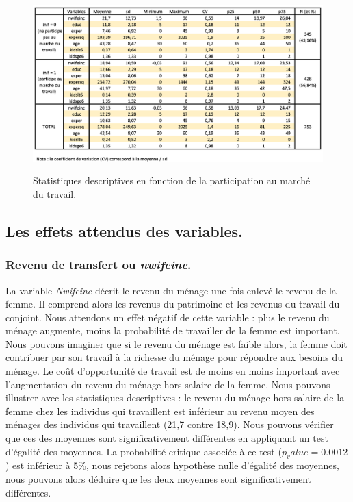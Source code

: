 \begin{figure}[h]
    \caption{Statistiques descriptives en fonction de la participation au marché du travail.}
    \includegraphics[scale = 0.65]{101_graphics/11_Stats_desc.png}
    \centering
    \label{fig:StatsDesc}
\end{figure}





\subsection{Les effets attendus des variables.}

\subsubsection*{Revenu de transfert ou \emph{nwifeinc}.}

La variable \emph{Nwifeinc} décrit le revenu du ménage une fois enlevé le revenu de la femme. Il comprend alors les revenus du patrimoine et les revenus du travail du conjoint. Nous attendons un effet négatif de cette variable : plus le revenu du ménage augmente, moins la probabilité de travailler de la femme est important. Nous pouvons imaginer que si le revenu du ménage est faible alors, la femme doit contribuer par son travail à la richesse du ménage pour répondre aux besoins du ménage. Le coût d’opportunité de travail est de moins en moins important avec l’augmentation du revenu du ménage hors salaire de la femme. Nous pouvons illustrer avec les statistiques descriptives : le revenu du ménage hors salaire de la femme chez les individus qui travaillent est inférieur au revenu moyen des ménages des individus qui travaillent (21,7 contre 18,9). Nous pouvons vérifier que ces des moyennes sont significativement différentes en appliquant un test d’égalité des moyennes. La probabilité critique associée à ce test ($p_value = 0.0012$) est inférieur à 5\%, nous rejetons alors hypothèse nulle d’égalité des moyennes, nous pouvons alors déduire que les deux moyennes sont significativement différentes.

